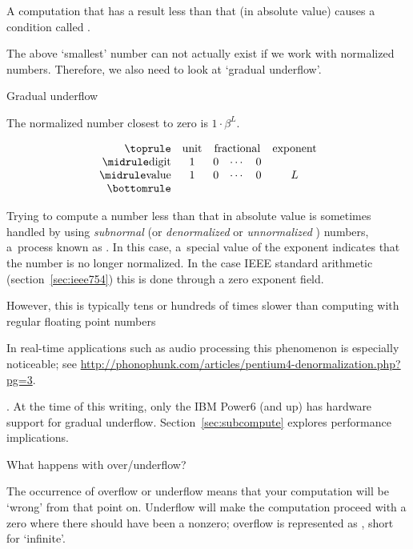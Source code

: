 A computation that has a result less than that
(in absolute value) causes a condition called . 

The above `smallest' number can not actually exist if we work with
normalized numbers.
Therefore, we also need to look at `gradual underflow'.

 {Gradual underflow}

The normalized number closest to zero is $1\cdot \beta^L$.

\begin{equation}
\begin{array}{rccccc}
  \toprule
  &\textrm{unit}&\multicolumn{3}{c}{\textrm{fractional}}&\textrm{exponent}\\
  \midrule
  \textrm{digit}& 1& 0&\cdots&0&\\
  \midrule
  \textrm{value}& 1& 0&\cdots&0&L\\
  \bottomrule
\end{array}
\end{equation}

Trying
to compute a number less than that in absolute value is sometimes
handled by using
\emph{subnormal}
(or \emph{denormalized}%
or \emph{unnormalized}%
%
) numbers,
a~process known as .
In this case, a~special
value of the exponent indicates that the number is no longer normalized.
In the case IEEE standard arithmetic (section~\ref{sec:ieee754})
this is done through a zero exponent field.

However, this is typically tens or hundreds of times slower than
computing with regular floating point numbers
\begin{footnoteenv}
  {In real-time
applications such as audio processing this phenomenon is especially
noticeable;
see
\url{http://phonophunk.com/articles/pentium4-denormalization.php?pg=3}.}
\end{footnoteenv}
. 
At the time of this writing, only the IBM Power6 (and up) has
hardware support for gradual underflow.
Section~\ref{sec:subcompute} explores performance implications.

 {What happens with over/underflow?}

The occurrence of overflow or underflow means that your computation
will be `wrong' from that point on. Underflow will make the computation
proceed with a zero where there should have been a nonzero;
overflow is represented as , short for `infinite'.

